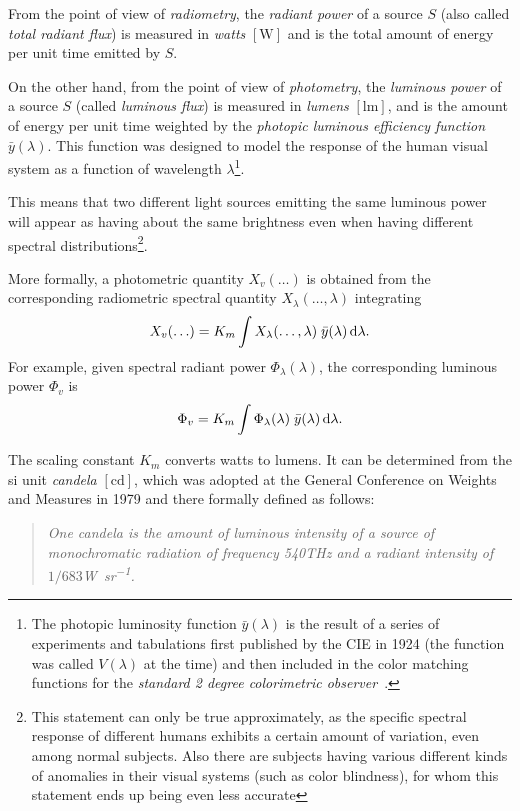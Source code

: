 From the point of view of \textsl{\gls{radiometry}}, the \textsl{radiant power} of a
source $S$
(also called \textsl{total radiant flux}) is measured in
\textit{watts} $[\unit{\watt}]$ and is the total amount of energy per unit time
emitted by $S$.

On the other hand, from the point of view of \textsl{\gls{photometry}}, the
\textsl{luminous power}
of a source $S$ (called \textsl{luminous flux}) is measured in
\textit{lumens} $[\unit{\lumen}]$, and is the amount of energy per unit time
weighted by the \textsl{photopic luminous efficiency function} $\bar y(\lambda)$. 
This function was designed to model the response of the human visual system as a function of wavelength $\lambda$\footnote{
	The photopic luminosity function $\bar y(\lambda)$ is the result of a series of experiments and tabulations first published by the \gls{CIE} in 1924 (the function was called $V(\lambda)$ at the time) and then included in the color matching functions for the \emph{standard 2 degree colorimetric observer}~\citep{cie1931}.}.

This means that two different light sources emitting the same luminous
power will appear as having about the same brightness even when having
different spectral distributions\footnote{This
statement can only be true approximately, as the specific spectral response
of different humans exhibits a certain amount of variation, even among
normal subjects.
Also there are subjects having various different kinds of anomalies in their
visual systems (such as color blindness), for whom this statement ends up being even less accurate}.

More formally, a photometric quantity $X_v(\ldots)$ is obtained from 
the corresponding radiometric spectral quantity $X_{\lambda}(\ldots, \lambda)$
integrating
\begin{equation}
X_v(\ldots) = K_m \int X_{\lambda}(\ldots,\lambda)\; \bar y (\lambda) \mathop{}\!\mathrm{d}\lambda.
\label{eqn:rad_to_photo}
\end{equation}
For example, given spectral radiant power $\Phi_{\lambda}(\lambda)$, the
corresponding
luminous power $\Phi_v$ is
\begin{displaymath}
\Phi_v = K_m \int \Phi_{\lambda}(\lambda)\; \bar y(\lambda) \mathop{}\!\mathrm{d}\lambda.
\end{displaymath}

The scaling constant $K_m$ converts watts to lumens. It can be determined
from the 
\gls{si} unit \textsl{candela} $[\unit{\candela}]$, which was adopted at
the General Conference on Weights and Measures in 1979 and
there formally defined as follows:
\begin{quote}
\emph{One candela is the amount of luminous intensity of a source of
monochromatic radiation of frequency \num{540}\unit{\tera\hertz} and
a radiant intensity of $1/683$\unit{\watt\per\steradian}.}
\end{quote}

